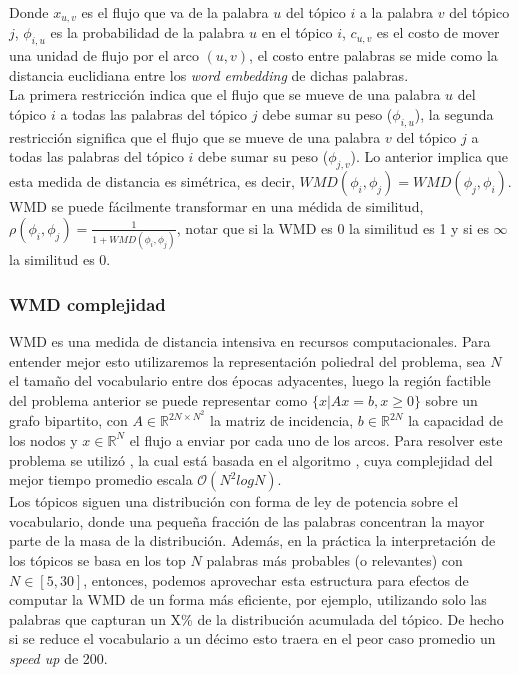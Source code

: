 \documentclass[letterpaper,12pt,oneside]{book} %
\begin{document}
Donde $x_{u,v}$ es el flujo que va de la palabra $u$ del tópico $i$ a la palabra $v$ del tópico $j$, $\phi_{i,u}$ es la probabilidad de la palabra $u$ en el tópico $i$, $c_{u,v}$ es el costo de mover una unidad de flujo por el arco $(u,v)$, el costo entre palabras se mide como la distancia euclidiana entre los \textit{word embedding} de dichas palabras.\\

La primera restricción indica que el flujo que se mueve de una palabra $u$ del tópico $i$ a todas las palabras del tópico $j$ debe sumar su peso ($\phi_{i,u}$), la segunda restricción significa que el flujo que se mueve de una palabra $v$ del tópico $j$ a todas las palabras del tópico $i$ debe sumar su peso ($\phi_{j,v}$). Lo anterior implica que esta medida de distancia es simétrica, es decir, $WMD(\phi_{i}, \phi_{j}) = WMD(\phi_{j}, \phi_{i})$.\\

WMD se puede fácilmente transformar en una médida de similitud, $\rho(\phi_{i}, \phi_{j}) = \frac{1}{1+WMD(\phi_{i}, \phi_{j})}$, notar que si la WMD es 0 la similitud es 1 y si es $\infty$ la similitud es 0. \\

\subsubsection{WMD complejidad}

WMD es una medida de distancia intensiva en recursos computacionales. Para entender mejor esto utilizaremos la representación poliedral del problema, sea $N$ el tamaño del vocabulario entre dos épocas adyacentes, luego la región factible del problema anterior se puede representar como $\{x| Ax=b, x\geq 0\}$ sobre un grafo bipartito, con $A\in \mathbb{R}^{2N\times N^{2}}$ la matriz de incidencia, $b\in \mathbb{R}^{2N}$ la capacidad de los nodos y $x\in \mathbb{R}^{N}$ el flujo a enviar por cada uno de los arcos. Para resolver este problema se utilizó \citep{PyEMD}, la cual está basada en el algoritmo \citep{pele2009fast}, cuya complejidad del mejor tiempo promedio escala $\mathcal{O}(N^{2}log N)$.\\

Los tópicos siguen una distribución con forma de ley de potencia sobre el vocabulario, donde una pequeña fracción de las palabras concentran la mayor parte de la masa de la distribución. Además, en la práctica la interpretación de los tópicos se basa en los top $N$ palabras más probables (o relevantes) con $N \in [5, 30]$, entonces, podemos aprovechar esta estructura para efectos de computar la WMD de un forma más eficiente, por ejemplo, utilizando solo las palabras que capturan un X\% de la distribución acumulada del tópico. De hecho si se reduce el vocabulario a un décimo esto traera en el peor caso promedio un \textit{speed up} de 200.\\
\end{document}
